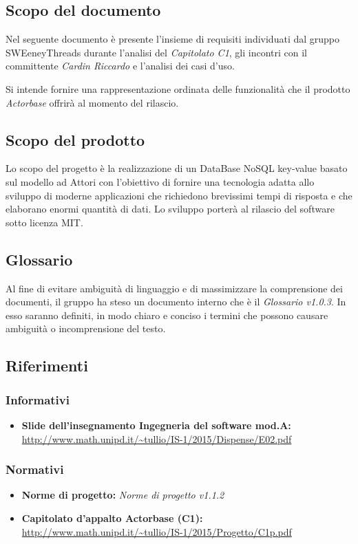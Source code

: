 \documentclass[a4paper]{article}
\begin{document}
	\subsection{Scopo del documento}
		Nel seguente documento è presente l'insieme di requisiti individuati dal gruppo 
		SWEeneyThreads durante l'analisi del \emph{Capitolato C1}, gli incontri con il committente 
		\emph{Cardin Riccardo} e l'analisi dei casi d'uso. 
		
		Si intende fornire una rappresentazione ordinata delle funzionalità che il prodotto \emph{Actorbase} 
		offrirà al momento del rilascio.
	\subsection{Scopo del prodotto}
		Lo scopo del progetto è la realizzazione di un DataBase NoSQL key-value basato sul modello ad 
		Attori con l'obiettivo di fornire una tecnologia adatta allo sviluppo di moderne 
		applicazioni che richiedono brevissimi tempi di risposta e che elaborano enormi quantità 
		di dati. Lo sviluppo porterà al rilascio del software sotto licenza MIT.
	\subsection{Glossario}
		Al fine di evitare ambiguità di linguaggio e di massimizzare la comprensione dei documenti, il 
      gruppo ha steso un documento interno che è il \emph{Glossario v1.0.3}. In esso saranno definiti, in modo
      chiaro e conciso i termini che possono causare ambiguità o incomprensione del testo.
	\subsection{Riferimenti}
	\subsubsection{Informativi}	
		\begin{itemize}
			\item \textbf{Slide dell'insegnamento Ingegneria del software mod.A:} \\
			\url{http://www.math.unipd.it/~tullio/IS-1/2015/Dispense/E02.pdf}
		\end{itemize}
	\subsubsection{Normativi}
		\begin{itemize}
			\item \textbf{Norme di progetto:} \emph{Norme di progetto v1.1.2}
			\item \textbf{Capitolato d'appalto Actorbase (C1):} \\ 
			\url{http://www.math.unipd.it/~tullio/IS-1/2015/Progetto/C1p.pdf}
		\end{itemize}
		
\end{document}

